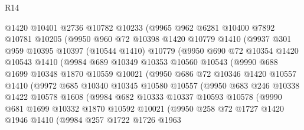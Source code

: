 \begin{lexlean}{R14}
\begin{coremodule}
          @1420
          @10401
          @2736
          @10782
          @10233
          (@9965
            @962
            @6281
            @10400
            @7892
            @10781
            @10205
            (@9950
              @960
              @72
              @10398
              @1420
              @10779
              @1410
              (@9937
                @301
                @959
                @10395
                @10397
                (@10544 @1410)
                @10779
                (@9950
                  @690
                  @72
                  @10354
                  @1420
                  @10543
                  @1410
                  (@9984
                    @689
                    @10349
                    @10353
                    @10560
                    @10543
                    (@9990
                      @688
                      @1699
                      @10348
                      @1870
                      @10559
                      @10021
                      (@9950
                        @686
                        @72
                        @10346
                        @1420
                        @10557
                        @1410
                        (@9972
                          @685
                          @10340
                          @10345
                          @10580
                          @10557
                          (@9950
                            @683
                            @246
                            @10338
                            @1422
                            @10578
                            @1608
                            (@9984
                              @682
                              @10333
                              @10337
                              @10593
                              @10578
                              (@9990
                                @681
                                @1699
                                @10332
                                @1870
                                @10592
                                @10021
                                (@9950
                                  @258
                                  @72
                                  @1727
                                  @1420
                                  @1946
                                  @1410
                                  (@9984
                                    @257
                                    @1722
                                    @1726
                                    @1963

\end{coremodule}
\end{lexlean}
